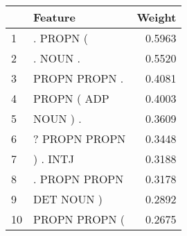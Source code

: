 \begin{tabular}{llr}
\toprule
{} &        Feature &  Weight \\
\midrule
1  &      . PROPN ( &  0.5963 \\
2  &       . NOUN . &  0.5520 \\
3  &  PROPN PROPN . &  0.4081 \\
4  &    PROPN ( ADP &  0.4003 \\
5  &       NOUN ) . &  0.3609 \\
6  &  ? PROPN PROPN &  0.3448 \\
7  &       ) . INTJ &  0.3188 \\
8  &  . PROPN PROPN &  0.3178 \\
9  &     DET NOUN ) &  0.2892 \\
10 &  PROPN PROPN ( &  0.2675 \\
\bottomrule
\end{tabular}
